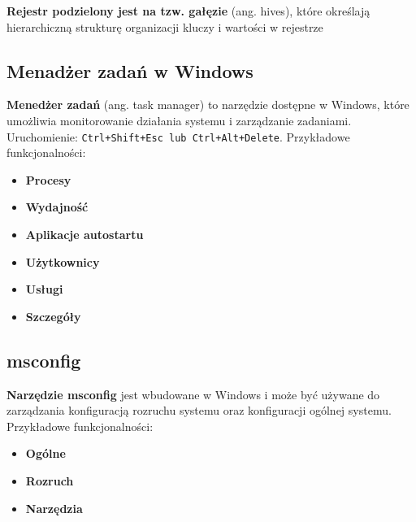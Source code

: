\documentclass{article}
\begin{document}
\textbf{Rejestr podzielony jest na tzw. gałęzie} (ang. hives), które określają hierarchiczną strukturę organizacji kluczy i wartości w rejestrze

\subsection{Menadżer zadań w Windows}
\textbf{Menedżer zadań} (ang. task manager) to narzędzie dostępne w Windows, które umożliwia monitorowanie działania systemu i zarządzanie zadaniami. Uruchomienie: \texttt{Ctrl+Shift+Esc lub Ctrl+Alt+Delete}. Przykładowe funkcjonalności:
\begin{itemize}
    \item \textbf{Procesy}
    \item \textbf{Wydajność}
    \item \textbf{Aplikacje autostartu}
    \item \textbf{Użytkownicy}
    \item \textbf{Usługi}
    \item \textbf{Szczegóły}
\end{itemize}

\subsection{msconfig}
\textbf{Narzędzie msconfig} jest wbudowane w Windows i może być używane do zarządzania konfiguracją rozruchu systemu oraz konfiguracji ogólnej systemu. Przykładowe funkcjonalności:
\begin{itemize}
    \item \textbf{Ogólne}
    \item \textbf{Rozruch}
    \item \textbf{Narzędzia}
\end{itemize}
\end{document}
